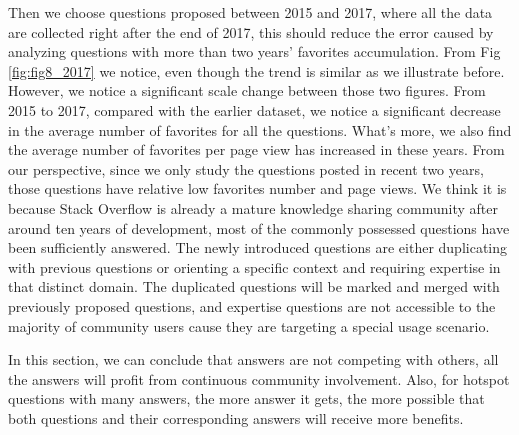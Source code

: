 Then we choose questions proposed between 2015 and 2017, where all the data are collected right after the end of 2017, this should reduce the error caused by analyzing questions with more than two years' favorites accumulation. From Fig \ref{fig:fig8_2017} we notice, even though the trend is similar as we illustrate before. However, we notice a significant scale change between those two figures. From 2015 to 2017, compared with the earlier dataset, we notice a significant decrease in the average number of favorites for all the questions. What's more, we also find the average number of favorites per page view has increased in these years. From our perspective, since we only study the questions posted in recent two years, those questions have relative low favorites number and page views. We think it is because Stack Overflow is already a mature knowledge sharing community after around ten years of development, most of the commonly possessed questions have been sufficiently answered. The newly introduced questions are either duplicating with previous questions or orienting a specific context and requiring expertise in that distinct domain. The duplicated questions will be marked and merged with previously proposed questions, and expertise questions are not accessible to the majority of community users cause they are targeting a special usage scenario. 

In this section, we can conclude that answers are not competing with others, all the answers will profit from continuous community involvement. Also, for hotspot questions with many answers, the more answer it gets, the more possible that both questions and their corresponding answers will receive more benefits.